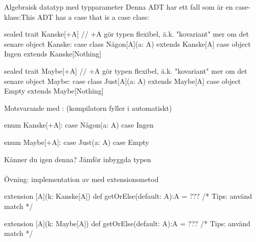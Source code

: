 \begin{Slide}{Algebraisk datatyp med typparameter}\SlideFontSmall
\ifswedish Denna ADT har ett fall som är en  case-klass:\else This ADT has a case that is a  case class:\fi     
\ifswedish
\begin{CodeSmall}
sealed trait Kanske[+A]   // +A gör typen flexibel, ä.k. "kovariant" mer om det senare
object Kanske:
  case class Någon[A](a: A) extends Kanske[A]
  case object Ingen extends Kanske[Nothing]   
\end{CodeSmall}
\else
\begin{CodeSmall}
sealed trait Maybe[+A]   // +A gör typen flexibel, ä.k. "kovariant" mer om det senare
object Maybe:
  case class Just[A](a: A) extends Maybe[A]
  case object Empty extends Maybe[Nothing]   
\end{CodeSmall}
\fi{}
\pause Motsvarande med : (kompilatorn fyller i  automatiskt)
\ifswedish
\begin{CodeSmall}
enum Kanske[+A]:
  case Någon(a: A)
  case Ingen     
\end{CodeSmall}
\else
\begin{CodeSmall}
enum Maybe[+A]:
  case Just(a: A)
  case Empty     
\end{CodeSmall}
\fi{}
Känner du igen denna? \pause Jämför inbyggda typen \\~\\Övning: implementation av  med extensionsmetod
\ifswedish
\begin{CodeSmall}
extension [A](k: Kanske[A]) def getOrElse(default: A):A = ??? 
   /* Tips: 
      använd match */
  
\end{CodeSmall}
\else
\begin{CodeSmall}
extension [A](k: Maybe[A]) def getOrElse(default: A):A = ??? 
   /* Tips: 
      använd match */
  
\end{CodeSmall}
\fi{}     
\end{Slide}

